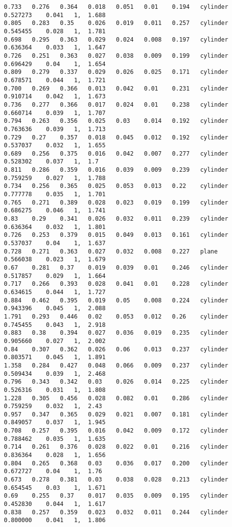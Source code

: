 {\begin{lstlisting}[caption={Datos obtenidos para la prueba del cilindro usando AGC.}]
0.733	0.276	0.364	0.018	0.051	0.01	0.194	cylinder	0.527273	0.041	1, 	1.688
0.805	0.283	0.35	0.026	0.019	0.011	0.257	cylinder	0.545455	0.028	1, 	1.781
0.698	0.295	0.363	0.029	0.024	0.008	0.197	cylinder	0.636364	0.033	1, 	1.647
0.726	0.251	0.363	0.027	0.038	0.009	0.199	cylinder	0.696429	0.04	1, 	1.654
0.809	0.279	0.337	0.029	0.026	0.025	0.171	cylinder	0.678571	0.044	1, 	1.721
0.700	0.269	0.366	0.013	0.042	0.01	0.231	cylinder	0.910714	0.042	1, 	1.673
0.736	0.277	0.366	0.017	0.024	0.01	0.238	cylinder	0.660714	0.039	1, 	1.707
0.794	0.263	0.356	0.025	0.03	0.014	0.192	cylinder	0.763636	0.039	1, 	1.713
0.729	0.27	0.357	0.018	0.045	0.012	0.192	cylinder	0.537037	0.032	1, 	1.655
0.689	0.256	0.375	0.016	0.042	0.007	0.277	cylinder	0.528302	0.037	1, 	1.7
0.811	0.286	0.359	0.016	0.039	0.009	0.239	cylinder	0.759259	0.027	1, 	1.788
0.734	0.256	0.365	0.025	0.053	0.013	0.22	cylinder	0.777778	0.035	1, 	1.701
0.765	0.271	0.389	0.028	0.023	0.019	0.199	cylinder	0.686275	0.046	1, 	1.741
0.83	0.29	0.341	0.026	0.032	0.011	0.239	cylinder	0.636364	0.032	1, 	1.801
0.726	0.253	0.379	0.015	0.049	0.013	0.161	cylinder	0.537037	0.04	1, 	1.637
0.728	0.271	0.363	0.027	0.032	0.008	0.227	plane		0.566038	0.023	1, 	1.679
0.67	0.281	0.37	0.019	0.039	0.01	0.246	cylinder	0.517857	0.029	1, 	1.664
0.717	0.266	0.393	0.028	0.041	0.01	0.228	cylinder	0.634615	0.044	1, 	1.727
0.884	0.462	0.395	0.019	0.05	0.008	0.224	cylinder	0.943396	0.045	1, 	2.088
1.791	0.293	0.446	0.02	0.053	0.012	0.26	cylinder	0.745455	0.043	1, 	2.918
0.883	0.38	0.394	0.027	0.036	0.019	0.235	cylinder	0.905660	0.027	1, 	2.002
0.84	0.307	0.362	0.026	0.06	0.013	0.237	cylinder	0.803571	0.045	1, 	1.891
1.358	0.284	0.427	0.048	0.066	0.009	0.237	cylinder	0.509434	0.039	1, 	2.468
0.796	0.343	0.342	0.03	0.026	0.014	0.225	cylinder	0.526316	0.031	1, 	1.808
1.228	0.305	0.456	0.028	0.082	0.01	0.286	cylinder	0.759259	0.032	1, 	2.43
0.957	0.347	0.365	0.029	0.021	0.007	0.181	cylinder	0.849057	0.037	1, 	1.945
0.708	0.257	0.395	0.016	0.042	0.009	0.172	cylinder	0.788462	0.035	1, 	1.635
0.714	0.261	0.376	0.028	0.022	0.01	0.216	cylinder	0.836364	0.028	1, 	1.656
0.804	0.265	0.368	0.03	0.036	0.017	0.200	cylinder	0.672727	0.04	1, 	1.76
0.673	0.278	0.381	0.03	0.038	0.028	0.213	cylinder	0.654545	0.03	1, 	1.671
0.69	0.255	0.37	0.017	0.035	0.009	0.195	cylinder	0.452830	0.044	1, 	1.617
0.838	0.257	0.359	0.023	0.032	0.011	0.244	cylinder	0.800000	0.041	1, 	1.806	
	\end{lstlisting}
}$ $ \\


